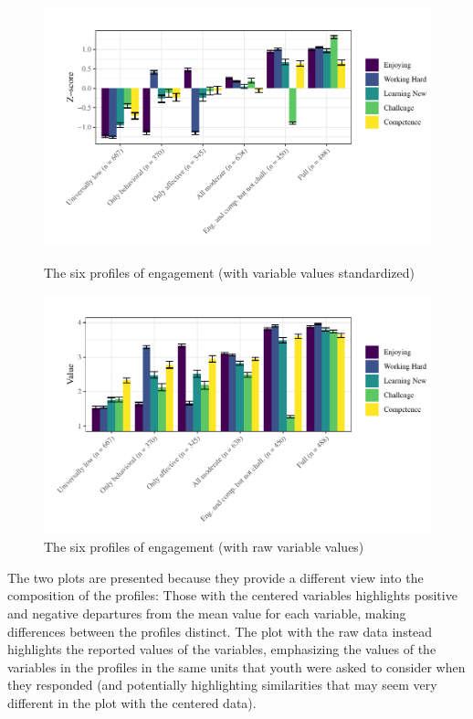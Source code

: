 \documentclass[]{msu-thesis}
\theoremstyle{definition}
\theoremstyle{definition}
\theoremstyle{definition}
\theoremstyle{remark}
\begin{document}
\begin{figure}

{\centering \includegraphics[width=1\linewidth]{rosenberg-dissertation_files/figure-latex/unnamed-chunk-11-1}

}

\caption{The six profiles of engagement (with variable values standardized)}\label{fig:unnamed-chunk-11}

{\centering \includegraphics[width=1\linewidth]{rosenberg-dissertation_files/figure-latex/unnamed-chunk-12-1}

}

\caption{The six profiles of engagement (with raw variable values)}\label{fig:unnamed-chunk-12}
\end{figure}

The two plots are presented because they provide a different view into
the composition of the profiles: Those with the centered variables
highlights positive and negative departures from the mean value for each
variable, making differences between the profiles distinct. The plot
with the raw data instead highlights the reported values of the
variables, emphasizing the values of the variables in the profiles in
the same units that youth were asked to consider when they responded
(and potentially highlighting similarities that may seem very different
in the plot with the centered data).
\end{document}
